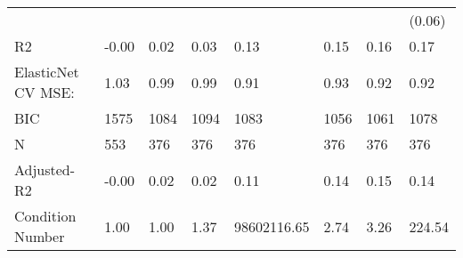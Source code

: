 \begin{table}
\begin{center}
\begin{tabular}{llllllll}
                                               &          &            &         &             &          &                    & (0.06)  \\
R2                                             & -0.00    & 0.02       & 0.03    & 0.13        & 0.15     & 0.16               & 0.17    \\
ElasticNet CV MSE:                             & 1.03     & 0.99       & 0.99    & 0.91        & 0.93     & 0.92               & 0.92    \\
BIC                                            & 1575     & 1084       & 1094    & 1083        & 1056     & 1061               & 1078    \\
N                                              & 553      & 376        & 376     & 376         & 376      & 376                & 376     \\
Adjusted-R2                                    & -0.00    & 0.02       & 0.02    & 0.11        & 0.14     & 0.15               & 0.14    \\
Condition Number                               & 1.00     & 1.00       & 1.37    & 98602116.65 & 2.74     & 3.26               & 224.54  \\
\hline
\end{tabular}
\end{center}
\end{table}